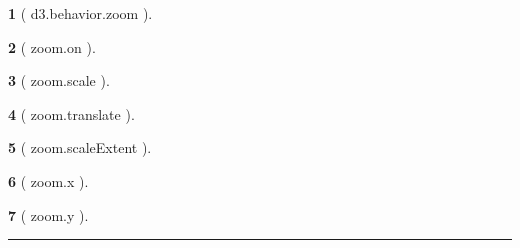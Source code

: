 \documentclass[10pt,landscape,letterpaper]{article}
\newcounter{thm}
\theoremstyle{mytheoremstyle}
\newtheorem*{thm}{}
\begin{document}
\begin{multicols}{3}
\begin{thm} [ d3.behavior.zoom ] 
\end{thm}\begin{thm} [ zoom.on ] 
\end{thm}\begin{thm} [ zoom.scale ] 
\end{thm}\begin{thm} [ zoom.translate ] 
\end{thm}\begin{thm} [ zoom.scaleExtent ] 
\end{thm}\begin{thm} [ zoom.x ] 
\end{thm}\begin{thm} [ zoom.y ] \end{thm}
\hrule
\hspace{1em}\vspace*{3in}\\
\hspace{1em}\\
\hspace{1em}\vspace*{7.5in}\\
\hspace{1em}
\end{multicols}
\end{document}
